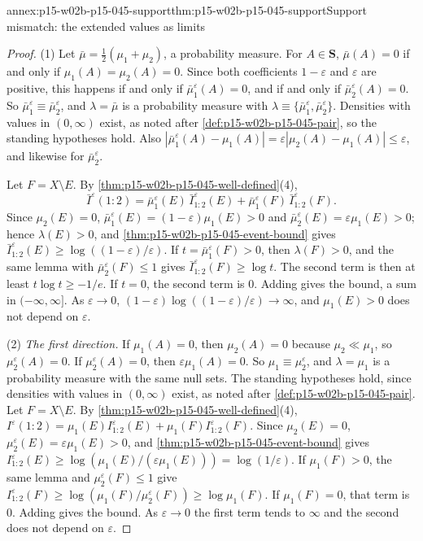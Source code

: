 \begin{annexitem}{annex:p15-w02b-p15-045-support}{thm:p15-w02b-p15-045-support}{Support mismatch: the extended values as limits}
\begin{proof}
(1) Let \(\bar\mu=\tfrac12(\mu_1+\mu_2)\), a probability measure. For
\(A\in\mathbf S\), \(\bar\mu(A)=0\) if and only if
\(\mu_1(A)=\mu_2(A)=0\). Since both coefficients \(1-\varepsilon\) and
\(\varepsilon\) are positive, this happens if and only if
\(\bar\mu_1^\varepsilon(A)=0\), and if and only if
\(\bar\mu_2^\varepsilon(A)=0\). So
\(\bar\mu_1^\varepsilon\equiv\bar\mu_2^\varepsilon\), and
\(\lambda=\bar\mu\) is a probability measure with
\(\lambda\equiv\{\bar\mu_1^\varepsilon,\bar\mu_2^\varepsilon\}\).
Densities with values in \((0,\infty)\) exist, as noted after
\cref{def:p15-w02b-p15-045-pair}, so the standing hypotheses hold. Also
\(|\bar\mu_1^\varepsilon(A)-\mu_1(A)|=\varepsilon|\mu_2(A)-\mu_1(A)|\leq\varepsilon\),
and likewise for \(\bar\mu_2^\varepsilon\).

Let \(F=X\setminus E\). By \cref{thm:p15-w02b-p15-045-well-defined}(4),
\[
  \bar I^\varepsilon(1:2)=\bar\mu_1^\varepsilon(E)\,\bar I^\varepsilon_{1:2}(E)
                       +\bar\mu_1^\varepsilon(F)\,\bar I^\varepsilon_{1:2}(F).
\]
Since \(\mu_2(E)=0\), \(\bar\mu_1^\varepsilon(E)=(1-\varepsilon)\mu_1(E)>0\)
and \(\bar\mu_2^\varepsilon(E)=\varepsilon\mu_1(E)>0\); hence
\(\lambda(E)>0\), and \cref{thm:p15-w02b-p15-045-event-bound} gives
\(\bar I^\varepsilon_{1:2}(E)\geq\log((1-\varepsilon)/\varepsilon)\).
If \(t=\bar\mu_1^\varepsilon(F)>0\), then \(\lambda(F)>0\), and the same
lemma with \(\bar\mu_2^\varepsilon(F)\leq1\) gives
\(\bar I^\varepsilon_{1:2}(F)\geq\log t\). The second term is then at
least \(t\log t\geq-1/e\). If \(t=0\), the second term is \(0\). Adding
gives the bound, a sum in \((-\infty,\infty]\). As \(\varepsilon\to0\),
\((1-\varepsilon)\log((1-\varepsilon)/\varepsilon)\to\infty\), and
\(\mu_1(E)>0\) does not depend on \(\varepsilon\).

(2) \emph{The first direction.} If \(\mu_1(A)=0\), then \(\mu_2(A)=0\) because \(\mu_2\ll\mu_1\), so
\(\mu_2^\varepsilon(A)=0\). If \(\mu_2^\varepsilon(A)=0\), then
\(\varepsilon\mu_1(A)=0\). So \(\mu_1\equiv\mu_2^\varepsilon\), and
\(\lambda=\mu_1\) is a probability measure with the same null sets. The
standing hypotheses hold, since densities with values in \((0,\infty)\)
exist, as noted after \cref{def:p15-w02b-p15-045-pair}. Let
\(F=X\setminus E\). By \cref{thm:p15-w02b-p15-045-well-defined}(4),
\(I^\varepsilon(1:2)=\mu_1(E)I^\varepsilon_{1:2}(E)+\mu_1(F)I^\varepsilon_{1:2}(F)\).
Since \(\mu_2(E)=0\), \(\mu_2^\varepsilon(E)=\varepsilon\mu_1(E)>0\), and
\cref{thm:p15-w02b-p15-045-event-bound} gives
\(I^\varepsilon_{1:2}(E)\geq\log(\mu_1(E)/(\varepsilon\mu_1(E)))=\log(1/\varepsilon)\).
If \(\mu_1(F)>0\), the same lemma and \(\mu_2^\varepsilon(F)\leq1\) give
\(I^\varepsilon_{1:2}(F)\geq\log(\mu_1(F)/\mu_2^\varepsilon(F))\geq\log\mu_1(F)\).
If \(\mu_1(F)=0\), that term is \(0\). Adding gives the bound. As
\(\varepsilon\to0\) the first term tends to \(\infty\) and the second
does not depend on \(\varepsilon\).


\end{proof}
\end{annexitem}
